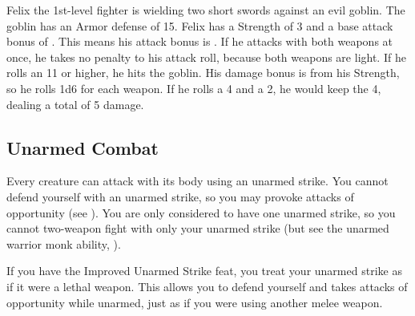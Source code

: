  Felix the 1st-level fighter is wielding two short swords against an evil goblin. The goblin has an Armor defense of 15. Felix has a Strength of 3 and a base attack bonus of . This means his attack bonus is . If he attacks with both weapons at once, he takes no penalty to his attack roll, because both weapons are light. If he rolls an 11 or higher, he hits the goblin. His damage bonus is  from his Strength, so he rolls 1d6 for each weapon. If he rolls a 4 and a 2, he would keep the 4, dealing a total of 5 damage.

\subsection{Unarmed Combat}\label{Unarmed Combat}
Every creature can attack with its body using an unarmed strike. You cannot defend yourself with an unarmed strike, so you may provoke attacks of opportunity (see ). You are only considered to have one unarmed strike, so you cannot two-weapon fight with only your unarmed strike (but see the unarmed warrior monk ability, ).

If you have the Improved Unarmed Strike feat, you treat your unarmed strike as if it were a lethal weapon. This allows you to defend yourself and takes attacks of opportunity while unarmed, just as if you were using another melee weapon.
